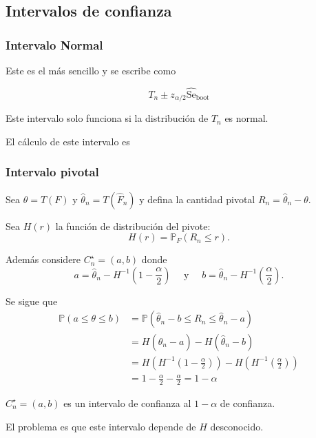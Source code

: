 \documentclass[12pt]{book}\usepackage[]{graphicx}\usepackage[]{color}
\theoremstyle{definition}
\theoremstyle{plain}
\begin{document}
\subsection{Intervalos de confianza}



\subsubsection{Intervalo Normal}

Este es el más sencillo y se escribe como

\begin{equation}
T_{n} \pm z_{\alpha / 2} \widehat{\mathrm{Se}}_{\mathrm{boot}}
\end{equation}

\begin{cuidado}{}{}
    Este intervalo solo funciona si la distribución de \(T_{n}\) es normal.
\end{cuidado}

\begin{laboratorio}{}{}
    El cálculo de este intervalo es

\end{laboratorio}

\subsubsection{Intervalo pivotal}

Sea  \(\theta=T(F)\) y  \(\widehat{\theta}_{n}=T\left(\widehat{F}_{n}\right)\) y defina la cantidad pivotal  \(R_{n}=\widehat{\theta}_{n}-\theta .\)

Sea  \(H(r)\) la función de distribución del pivote:
\[
H(r)=\mathbb{P}_{F}\left(R_{n} \leq r\right).
\]

Además considere  \(C_{n}^{\star}=(a, b)\)  donde
\[
a=\widehat{\theta}_{n}-H^{-1}\left(1-\frac{\alpha}{2}\right) \quad \text { y } \quad b=\widehat{\theta}_{n}-H^{-1}\left(\frac{\alpha}{2}\right).
\]

Se sigue que
\begin{align*}
\mathbb{P}(a \leq \theta \leq b)
&=\mathbb{P}\left(\widehat{\theta}_{n}-b \leq R_{n} \leq \widehat{\theta}_{n}-a\right) \\
&=H\left(\widehat{\theta}_{n}-a\right)-H\left(\widehat{\theta}_{n}-b\right) \\
&=H\left(H^{-1}\left(1-\frac{\alpha}{2}\right)\right)-H\left(H^{-1}\left(\frac{\alpha}{2}\right)\right) \\
&=1-\frac{\alpha}{2}-\frac{\alpha}{2}=1-\alpha
\end{align*}
\begin{nota}{}{}
     \(C_{n}^{\star}=(a, b)\)  es un intervalo de confianza al \(1-\alpha\) de confianza.

     El problema es que este intervalo depende de \(H\) desconocido.

\end{nota}
\end{document}
